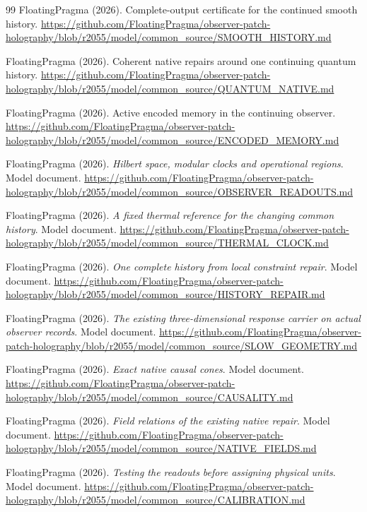 \documentclass[11pt]{article}
\theoremstyle{definition}
\theoremstyle{remark}
\theoremstyle{plain}
\begin{document}
{\begin{thebibliography}{99}
FloatingPragma (2026). Complete-output certificate for the continued smooth history.
\url{https://github.com/FloatingPragma/observer-patch-holography/blob/r2055/model/common_source/SMOOTH_HISTORY.md}

FloatingPragma (2026). Coherent native repairs around one continuing quantum history.
\url{https://github.com/FloatingPragma/observer-patch-holography/blob/r2055/model/common_source/QUANTUM_NATIVE.md}

FloatingPragma (2026). Active encoded memory in the continuing observer.
\url{https://github.com/FloatingPragma/observer-patch-holography/blob/r2055/model/common_source/ENCODED_MEMORY.md}

FloatingPragma (2026). \emph{Hilbert space, modular clocks and operational
regions}. Model document.
\url{https://github.com/FloatingPragma/observer-patch-holography/blob/r2055/model/common_source/OBSERVER_READOUTS.md}

FloatingPragma (2026). \emph{A fixed thermal reference for the changing common
history}. Model document.
\url{https://github.com/FloatingPragma/observer-patch-holography/blob/r2055/model/common_source/THERMAL_CLOCK.md}

FloatingPragma (2026). \emph{One complete history from local constraint
repair}. Model document.
\url{https://github.com/FloatingPragma/observer-patch-holography/blob/r2055/model/common_source/HISTORY_REPAIR.md}

FloatingPragma (2026). \emph{The existing three-dimensional response carrier on
actual observer records}. Model document.
\url{https://github.com/FloatingPragma/observer-patch-holography/blob/r2055/model/common_source/SLOW_GEOMETRY.md}

FloatingPragma (2026). \emph{Exact native causal cones}. Model document.
\url{https://github.com/FloatingPragma/observer-patch-holography/blob/r2055/model/common_source/CAUSALITY.md}

FloatingPragma (2026). \emph{Field relations of the existing native repair}.
Model document.
\url{https://github.com/FloatingPragma/observer-patch-holography/blob/r2055/model/common_source/NATIVE_FIELDS.md}

FloatingPragma (2026). \emph{Testing the readouts before assigning physical
units}. Model document.
\url{https://github.com/FloatingPragma/observer-patch-holography/blob/r2055/model/common_source/CALIBRATION.md}


\end{thebibliography}}
\end{document}
